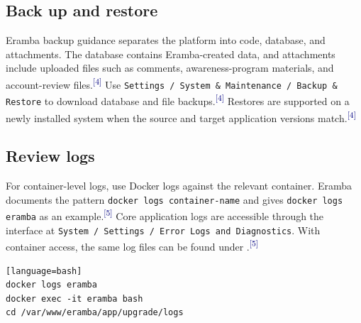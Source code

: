 \documentclass[10pt,letterpaper]{article}
\newcommand{\source}[1]{\textsuperscript{\textcolor{navy}{#1}}}
\begin{document}
\subsection{Back up and restore}
Eramba backup guidance separates the platform into code, database, and attachments. The database contains Eramba-created data, and attachments include uploaded files such as comments, awareness-program materials, and account-review files.\source{[4]} Use \texttt{Settings / System \& Maintenance / Backup \& Restore} to download database and file backups.\source{[4]} Restores are supported on a newly installed system when the source and target application versions match.\source{[4]}

\subsection{Review logs}
For container-level logs, use Docker logs against the relevant container. Eramba documents the pattern \texttt{docker logs container-name} and gives \texttt{docker logs eramba} as an example.\source{[5]} Core application logs are accessible through the interface at \texttt{System / Settings / Error Logs and Diagnostics}. With container access, the same log files can be found under .\source{[5]}

\begin{verbatim}[language=bash]
docker logs eramba
docker exec -it eramba bash
cd /var/www/eramba/app/upgrade/logs
\end{verbatim}
\end{document}
